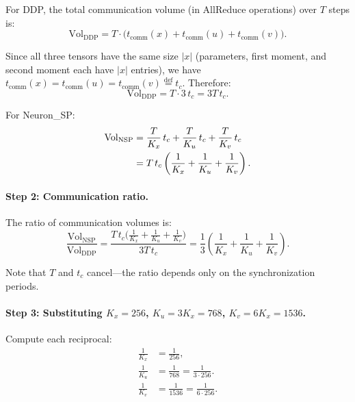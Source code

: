 \documentclass{article}
\begin{document}
For DDP, the total communication volume (in AllReduce operations) over
$T$ steps is:
\begin{equation}
\text{Vol}_{\text{DDP}} = T \cdot \bigl(
t_{\text{comm}}(x) + t_{\text{comm}}(u) + t_{\text{comm}}(v)\bigr).
\label{eq:vol_ddp}
\end{equation}

Since all three tensors have the same size $|x|$ (parameters, first
moment, and second moment each have $|x|$ entries), we have
$t_{\text{comm}}(x) = t_{\text{comm}}(u) = t_{\text{comm}}(v)
\stackrel{\text{def}}{=} t_c$. Therefore:
\begin{equation}
\text{Vol}_{\text{DDP}} = T \cdot 3\,t_c = 3T\,t_c.
\label{eq:vol_ddp_simplified}
\end{equation}

For Neuron\_SP:
\begin{align}
\text{Vol}_{\text{NSP}}
&= \frac{T}{K_x}\,t_c + \frac{T}{K_u}\,t_c + \frac{T}{K_v}\,t_c
\notag \\
&= T\,t_c \left(\frac{1}{K_x} + \frac{1}{K_u} + \frac{1}{K_v}\right).
\label{eq:vol_nsp}
\end{align}

\paragraph{Step 2: Communication ratio.}

The ratio of communication volumes is:
\begin{equation}
\frac{\text{Vol}_{\text{NSP}}}{\text{Vol}_{\text{DDP}}}
= \frac{T\,t_c\bigl(\frac{1}{K_x} + \frac{1}{K_u} + \frac{1}{K_v}\bigr)}{3T\,t_c}
= \frac{1}{3}\left(\frac{1}{K_x} + \frac{1}{K_u} + \frac{1}{K_v}\right).
\label{eq:comm_ratio}
\end{equation}

Note that $T$ and $t_c$ cancel---the ratio depends only on the
synchronization periods.

\paragraph{Step 3: Substituting $K_x = 256$, $K_u = 3K_x = 768$,
$K_v = 6K_x = 1536$.}

Compute each reciprocal:
\begin{align}
\frac{1}{K_x} &= \frac{1}{256}, \label{eq:recip_Kx} \\[4pt]
\frac{1}{K_u} &= \frac{1}{768}
= \frac{1}{3 \cdot 256}. \label{eq:recip_Ku} \\[4pt]
\frac{1}{K_v} &= \frac{1}{1536}
= \frac{1}{6 \cdot 256}. \label{eq:recip_Kv}
\end{align}
\end{document}
